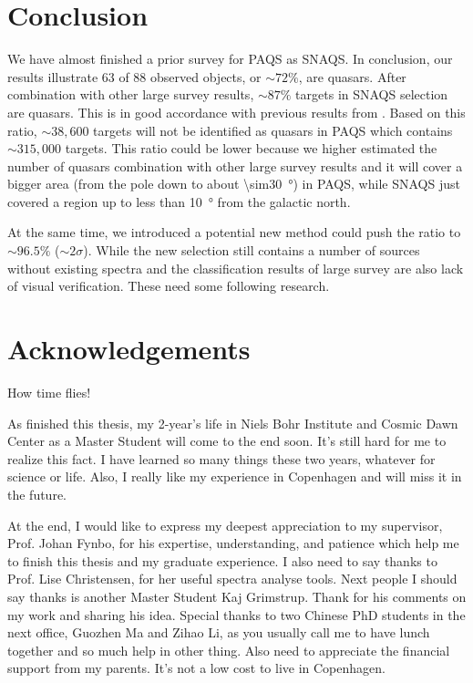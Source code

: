 \documentclass[12pt, a4paper]{memoir}
\begin{document}






\chapter{Conclusion}

We have almost finished a prior survey for PAQS as SNAQS. In conclusion, our results illustrate 63 of 88 observed objects, or $\sim72\%$, are quasars. After combination with other large survey results, $\sim87\%$ targets in SNAQS selection are quasars. This is in good accordance with previous results from \citet{heintz_study_2015}. Based on this ratio, $\sim 38,600$ targets will not be identified as quasars in PAQS which contains $\sim315,000$ targets. This ratio could be lower because we higher estimated the number of quasars combination with other large survey results and it will cover a bigger area (from the pole down to about \qty{\sim30}{\degree}) in PAQS, while SNAQS just covered a region up to less than \qty{10}{\degree} from the galactic north.

At the same time, we introduced a potential new method could push the ratio to $\sim96.5\%$ ($\sim2\sigma$). While the new selection still contains a number of sources without existing spectra and the classification results of large survey are also lack of visual verification. These need some following research.

\newpage

\chapter*{Acknowledgements}

How time flies! 

As finished this thesis, my 2-year's life in Niels Bohr Institute and Cosmic Dawn Center as a Master Student will come to the end soon. It's still hard for me to realize this fact. I have learned so many things these two years, whatever for science or life. Also, I really like my experience in Copenhagen and will miss it in the future.

At the end, I would like to express my deepest appreciation to my supervisor, Prof. Johan Fynbo, for his expertise, understanding, and patience which help me to finish this thesis and my graduate experience. I also need to say thanks to Prof. Lise Christensen, for her useful spectra analyse tools. Next people I should say thanks is another Master Student Kaj Grimstrup. Thank for his comments on my work and sharing his idea. Special thanks to two Chinese PhD students in the next office, Guozhen Ma and Zihao Li, as you usually call me to have lunch together and so much help in other thing. Also need to appreciate the financial support from my parents. It's not a low cost to live in Copenhagen.
\end{document}

